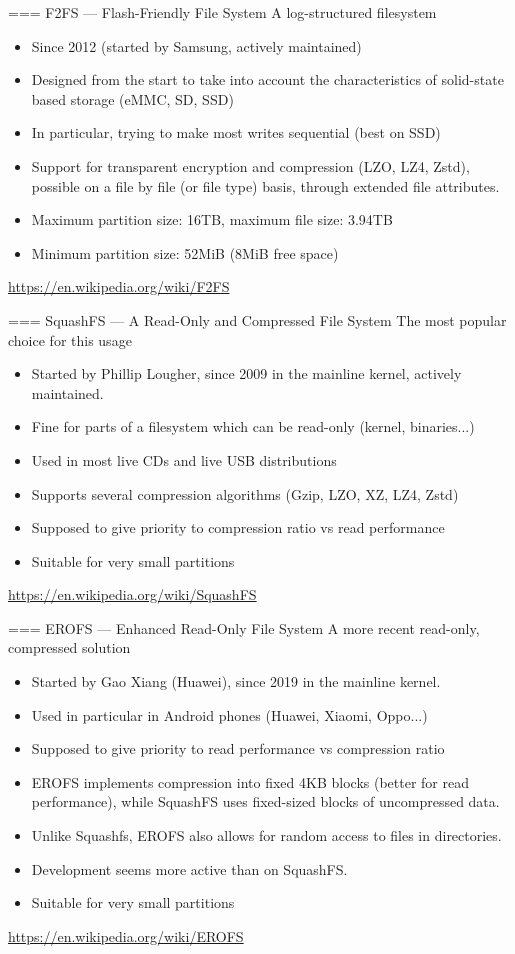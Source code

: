 === {F2FS --- Flash-Friendly File System}
    A log-structured filesystem
    \begin{itemize}
        \item Since 2012 (started by Samsung, actively maintained)
        \item Designed from the start to take into account the
              characteristics of solid-state based storage (eMMC, SD, SSD)
        \item In particular, trying to make most writes sequential (best on SSD)
        \item Support for transparent encryption and compression (LZO,
              LZ4, Zstd), possible on a file by file (or file type)
              basis, through extended file attributes.
        \item Maximum partition size: 16TB, maximum file size: 3.94TB
        \item Minimum partition size: 52MiB (8MiB free space)
    \end{itemize}
    \url{https://en.wikipedia.org/wiki/F2FS}


=== {SquashFS --- A Read-Only and Compressed File System}
    The most popular choice for this usage
    \begin{itemize}
        \item Started by Phillip Lougher, since 2009 in the mainline kernel, actively maintained.
        \item Fine for parts of a filesystem which can be read-only (kernel, binaries...)
        \item Used in most live CDs and live USB distributions
        \item Supports several compression algorithms (Gzip, LZO, XZ, LZ4, Zstd)
        \item Supposed to give priority to compression ratio vs read performance
        \item Suitable for very small partitions
    \end{itemize}
    \url{https://en.wikipedia.org/wiki/SquashFS}


=== {EROFS --- Enhanced Read-Only File System}
    A more recent read-only, compressed solution
    \begin{itemize}
        \item Started by Gao Xiang (Huawei), since 2019 in the mainline kernel.
        \item Used in particular in Android phones (Huawei, Xiaomi, Oppo...)
        \item Supposed to give priority to read performance vs compression ratio
        \item EROFS implements compression into fixed 4KB blocks (better for read
              performance), while SquashFS uses fixed-sized blocks of uncompressed
              data.
        \item Unlike Squashfs, EROFS also allows for random access to files in
              directories.
        \item Development seems more active than on SquashFS.
        \item Suitable for very small partitions
    \end{itemize}
    \url{https://en.wikipedia.org/wiki/EROFS}



